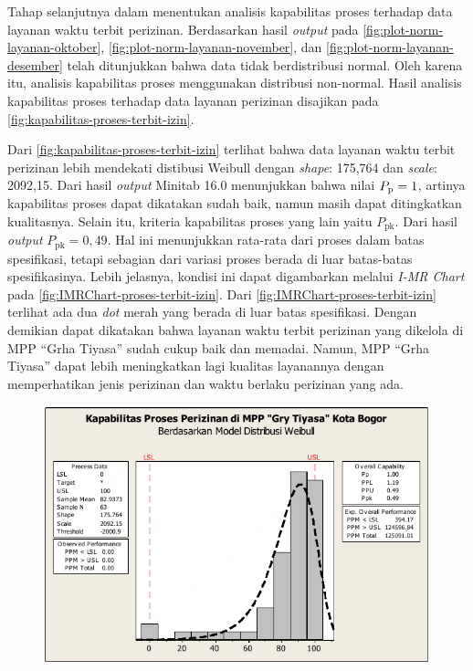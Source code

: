 Tahap selanjutnya dalam menentukan analisis kapabilitas proses terhadap data layanan waktu terbit perizinan. Berdasarkan hasil \textit{output} pada \autoref{fig:plot-norm-layanan-oktober}, \autoref{fig:plot-norm-layanan-november}, dan \autoref{fig:plot-norm-layanan-desember} telah ditunjukkan bahwa data tidak berdistribusi normal. Oleh karena itu, analisis kapabilitas proses menggunakan distribusi non-normal. Hasil analisis kapabilitas proses terhadap data layanan
perizinan disajikan pada \autoref{fig:kapabilitas-proses-terbit-izin}.

Dari \autoref{fig:kapabilitas-proses-terbit-izin} terlihat bahwa data layanan waktu terbit perizinan lebih mendekati distibusi Weibull dengan \textit{shape}: 175,764 dan \textit{scale}: 2092,15. Dari hasil \textit{output} Minitab 16.0 menunjukkan bahwa nilai $P_{\mathrm{p}} = 1$, artinya kapabilitas proses dapat dikatakan sudah baik, namun masih dapat ditingkatkan kualitasnya. Selain itu, kriteria kapabilitas proses yang lain yaitu $P_{\mathrm{pk}}$. Dari hasil \textit{output} $P_{\mathrm{pk}} = 0{,}49$. Hal ini menunjukkan rata-rata dari proses dalam batas spesifikasi, tetapi sebagian dari variasi proses berada di luar batas-batas spesifikasinya. Lebih jelasnya, kondisi ini dapat digambarkan melalui \textit{I-MR Chart} pada \autoref{fig:IMRChart-proses-terbit-izin}. Dari \autoref{fig:IMRChart-proses-terbit-izin} terlihat ada dua \textit{dot} merah yang berada di luar batas spesifikasi. Dengan demikian dapat dikatakan bahwa layanan waktu terbit perizinan yang dikelola di MPP ``Grha Tiyasa'' sudah cukup baik dan memadai. Namun, MPP ``Grha Tiyasa'' dapat lebih meningkatkan lagi kualitas layanannya dengan memperhatikan jenis perizinan dan waktu berlaku perizinan yang ada.

\begin{figure}[H]
    \centering
    \includegraphics[width=.7\linewidth]{pdf/Analisis-kapabilitas-proses-pada-layanan-waktu-terbit-perizinan-di-MMP-Grha-Tiyasa.pdf}
    \label{fig:kapabilitas-proses-terbit-izin}
\end{figure}


